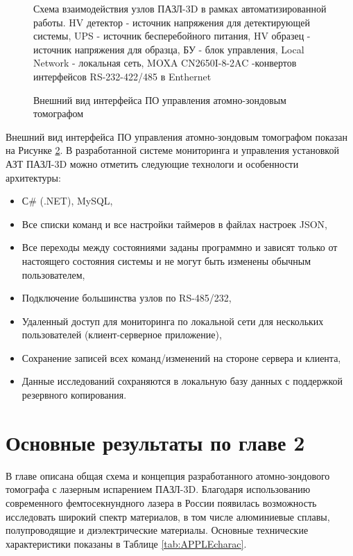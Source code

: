 \begin{figure}[htb]
	\caption{Схема взаимодействия узлов ПАЗЛ-3D в рамках автоматизированной работы. HV детектор - источник напряжения для детектирующей системы, UPS - источник бесперебойного питания, HV образец - источник напряжения для образца, БУ - блок управления, Local Network - локальная сеть, MOXA CN2650I-8-2AC -конвертов интерфейсов RS-232-422/485 в Enthernet}
	\label{fig:auto_APPLE_scheme}
\end{figure}

\begin{figure}[htb]
	\caption{Внешний вид интерфейса ПО управления атомно-зондовым томографом}
	\label{fig:auto_APPLE_Jabber}
\end{figure}

Внешний вид интерфейса ПО управления атомно-зондовым томографом показан на Рисунке \cref{fig:auto_APPLE_Jabber}. В разработанной системе мониторинга и управления установкой АЗТ ПАЗЛ-3D можно отметить следующие  технологи и особенности архитектуры:

\begin{itemize}[beginpenalty=10000]
	\item С$\#$ (.NET), MySQL,
	\item Все списки команд и все настройки таймеров в файлах настроек JSON,
	\item Все переходы между состояниями заданы программно и зависят только от настоящего состояния системы и не могут быть изменены обычным пользователем,
	\item Подключение большинства узлов по RS-485/232,
	\item Удаленный доступ для мониторинга по локальной сети для нескольких пользователей (клиент-серверное приложение),
	\item Сохранение записей всех команд/изменений на стороне сервера и клиента,
	\item Данные исследований сохраняются в локальную базу данных с поддержкой резервного копирования.
\end{itemize}


\FloatBarrier
\section{Основные результаты по главе 2}\label{sec:ch2/sec7}

В главе описана общая схема и концепция разработанного атомно-зондового томографа с лазерным испарением ПАЗЛ-3D. Благодаря использованию современного фемтосекнундного лазера в России появилась возможность исследовать широкий спектр материалов, в том числе алюминиевые сплавы, полупроводящие и диэлектрические материалы. Основные технические характеристики показаны в Таблице \cref{tab:APPLEcharac}.

